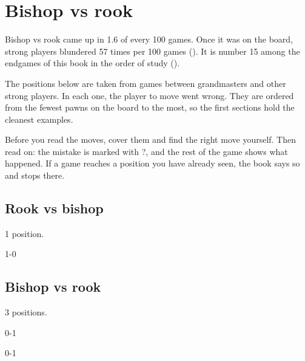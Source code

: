 \chapter{Bishop vs rook}\label{ch:bishop-vs-rook}
Bishop vs rook came up in 1.6 of every 100 games. Once it was on the board, strong players blundered 57 times per 100 games (). It is number 15 among the endgames of this book in the order of study ().

The positions below are taken from games between grandmasters and other strong players. In each one, the player to move went wrong. They are ordered from the fewest pawns on the board to the most, so the first sections hold the cleanest examples.

Before you read the moves, cover them and find the right move yourself. Then read on: the mistake is marked with ?, and the rest of the game shows what happened. If a game reaches a position you have already seen, the book says so and stops there.


\section{Rook vs bishop}
1 position.


1-0\par
\section{Bishop vs rook}
3 positions.


0-1\par
{}

0-1\par
{}

